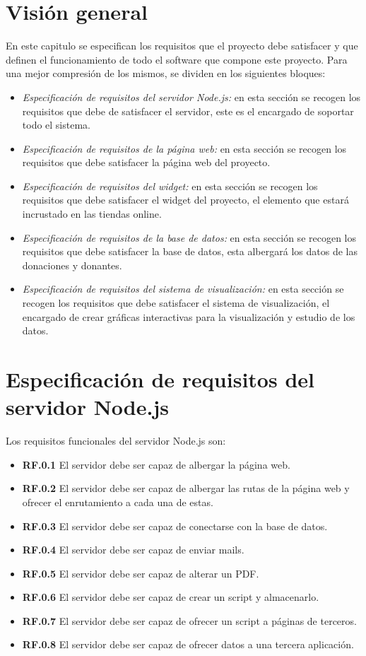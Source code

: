 \section{Visión general}

En este capitulo se especifican los requisitos que el proyecto debe satisfacer y que definen el funcionamiento de todo el software que compone este proyecto. Para una mejor compresión de los mismos, se dividen en los siguientes bloques:

\begin{itemize}
	\item \textit{Especificación de requisitos del servidor Node.js:} en esta sección se recogen los requisitos que debe de satisfacer el servidor, este es el encargado de soportar todo el sistema.
	\item \textit{Especificación de requisitos de la página web:} en esta sección se recogen los requisitos que debe satisfacer la página web del proyecto.
	\item \textit{Especificación de requisitos del widget:} en esta sección se recogen los requisitos que debe satisfacer el widget del proyecto, el elemento que estará incrustado en las tiendas online.
	\item \textit{Especificación de requisitos de la base de datos:} en esta sección se recogen los requisitos que debe satisfacer la base de datos, esta albergará los datos de las donaciones y donantes.
	\item \textit{Especificación de requisitos del sistema de visualización:} en esta sección se recogen los requisitos que debe satisfacer el sistema de visualización, el encargado de crear gráficas interactivas para la visualización y estudio de los datos.
\end{itemize}

\section{Especificación de requisitos del servidor Node.js}
Los requisitos funcionales del servidor Node.js son:

\begin{itemize}
	\item \textbf{RF.0.1} El servidor debe ser capaz de albergar la página web.
	\item \textbf{RF.0.2} El servidor debe ser capaz de albergar las rutas de la página web y ofrecer el enrutamiento a cada una de estas.
	\item \textbf{RF.0.3} El servidor debe ser capaz de conectarse con la base de datos.
	\item \textbf{RF.0.4} El servidor debe ser capaz de enviar mails.
	\item \textbf{RF.0.5} El servidor debe ser capaz de alterar un PDF.
	\item \textbf{RF.0.6} El servidor debe ser capaz de crear un script y almacenarlo.
	\item \textbf{RF.0.7} El servidor debe ser capaz de ofrecer un script a páginas de terceros.
	\item \textbf{RF.0.8} El servidor debe ser capaz de ofrecer datos a una tercera aplicación.
\end{itemize}

